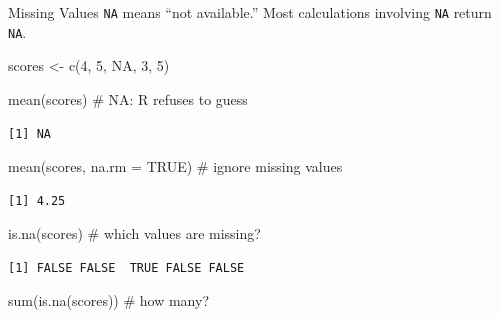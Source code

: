 \documentclass[
  ignorenonframetext,
  aspectratio=169,
]{beamer}
\newenvironment{Shaded}{\begin{snugshade}}{\end{snugshade}}
\newcommand{\AttributeTok}[1]{\textcolor[rgb]{0.40,0.45,0.13}{#1}}
\newcommand{\CommentTok}[1]{\textcolor[rgb]{0.37,0.37,0.37}{#1}}
\newcommand{\ConstantTok}[1]{\textcolor[rgb]{0.56,0.35,0.01}{#1}}
\newcommand{\DecValTok}[1]{\textcolor[rgb]{0.68,0.00,0.00}{#1}}
\newcommand{\FunctionTok}[1]{\textcolor[rgb]{0.28,0.35,0.67}{#1}}
\newcommand{\NormalTok}[1]{\textcolor[rgb]{0.00,0.23,0.31}{#1}}
\newcommand{\OtherTok}[1]{\textcolor[rgb]{0.00,0.23,0.31}{#1}}
\begin{document}
\begin{frame}[fragile]{Missing Values}
\protect\hypertarget{sec-na}{}
\texttt{NA} means ``not available.'' Most calculations involving
\texttt{NA} return \texttt{NA}.

\begin{Shaded}
\begin{Highlighting}[]
\NormalTok{scores }\OtherTok{\textless{}{-}} \FunctionTok{c}\NormalTok{(}\DecValTok{4}\NormalTok{, }\DecValTok{5}\NormalTok{, }\ConstantTok{NA}\NormalTok{, }\DecValTok{3}\NormalTok{, }\DecValTok{5}\NormalTok{)}

\FunctionTok{mean}\NormalTok{(scores)                 }\CommentTok{\# NA: R refuses to guess}
\end{Highlighting}
\end{Shaded}

\begingroup\tiny\color{darkgray}

\begin{verbatim}
[1] NA
\end{verbatim}

\endgroup

\begin{Shaded}
\begin{Highlighting}[]
\FunctionTok{mean}\NormalTok{(scores, }\AttributeTok{na.rm =} \ConstantTok{TRUE}\NormalTok{)   }\CommentTok{\# ignore missing values}
\end{Highlighting}
\end{Shaded}

\begingroup\tiny\color{darkgray}

\begin{verbatim}
[1] 4.25
\end{verbatim}

\endgroup

\begin{Shaded}
\begin{Highlighting}[]
\FunctionTok{is.na}\NormalTok{(scores)                }\CommentTok{\# which values are missing?}
\end{Highlighting}
\end{Shaded}

\begingroup\tiny\color{darkgray}

\begin{verbatim}
[1] FALSE FALSE  TRUE FALSE FALSE
\end{verbatim}

\endgroup

\begin{Shaded}
\begin{Highlighting}[]
\FunctionTok{sum}\NormalTok{(}\FunctionTok{is.na}\NormalTok{(scores))           }\CommentTok{\# how many?}
\end{Highlighting}
\end{Shaded}


\end{frame}
\end{document}
